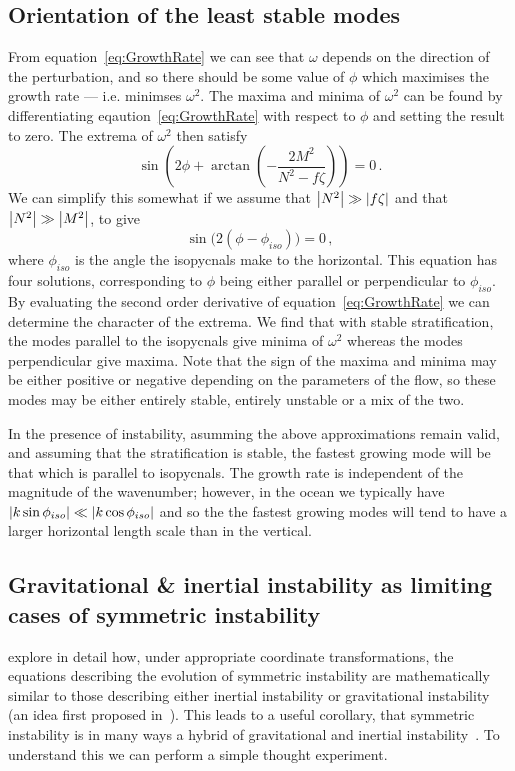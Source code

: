     \subsection{Orientation of the least stable modes}
    From equation~\ref{eq:GrowthRate} we can see that $\omega$ depends on the direction of the perturbation, and so there should be some value of $\phi$ which maximises the growth rate --- i.e. minimses $\omega^2$. The maxima and minima of $\omega^2$ can be found by differentiating eqaution~\ref{eq:GrowthRate} with respect to $\phi$ and setting the result to zero. The extrema of $\omega^2$ then satisfy
    \begin{equation}
        \sin(2 \phi + \arctan(-\frac{2M^2}{N^2 - f \zeta})) = 0 \, .
    \end{equation}
    We can simplify this somewhat if we assume that $\abs{N^2} \gg \abs{f \zeta}$ and that $\abs{N^2} \gg \abs{M^2}$, to give
    \begin{equation}
        \label{eq:UnstableDirections}
        \sin\big(2(\phi - \phi_{iso})\big) = 0 \, ,
    \end{equation}
    where $\phi_{iso}$ is the angle the isopycnals make to the horizontal. This equation has four solutions, corresponding to $\phi$ being either parallel or perpendicular to $\phi_{iso}$. By evaluating the second order derivative of equation~\ref{eq:GrowthRate} we can determine the character of the extrema. We find that with stable stratification, the modes parallel to the isopycnals give minima of $\omega^2$ whereas the modes perpendicular give maxima. Note that the sign of the maxima and minima may be either positive or negative depending on the parameters of the flow, so these modes may be either entirely stable, entirely unstable or a mix of the two.

    In the presence of instability, asumming the above approximations remain valid, and assuming that the stratification is stable, the fastest growing mode will be that which is parallel to isopycnals. The growth rate is independent of the magnitude of the wavenumber; however, in the ocean we typically have $\abs{k \sin\phi_{iso}} \ll \abs{k \cos\phi_{iso}}$ and so the the fastest growing modes will tend to have a larger horizontal length scale than in the vertical.

    \subsection{Gravitational \& inertial instability as limiting cases of symmetric instability}
    \citet{Xu1985} explore in detail how, under appropriate coordinate transformations, the equations describing the evolution of symmetric instability are mathematically similar to those describing either inertial instability or gravitational instability (an idea first proposed in~\citet{Hoskins1974}). This leads to a useful corollary, that symmetric instability is in many ways a hybrid of gravitational and inertial instability~\citep[e.g.][]{Haine1998}. To understand this we can perform a simple thought experiment.

